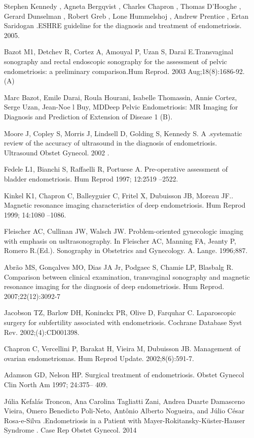 \documentclass[12pt]{article} %
\begin{document}
Stephen Kennedy , Agneta Bergqvist  , Charles Chapron  , Thomas D’Hooghe  , Gerard Dunselman  , Robert Greb  , Lone Hummelshoj  , Andrew Prentice  , Ertan Saridogan .ESHRE guideline for the diagnosis and treatment of endometriosis. 2005.

Bazot M1, Detchev R, Cortez A, Amouyal P, Uzan S, Daraï E.Transvaginal sonography and rectal endoscopic sonography for the assessment of pelvic endometriosis: a preliminary comparison.Hum Reprod. 2003 Aug;18(8):1686-92. (A)

Marc Bazot, Emile Darai, Roula Hourani, Isabelle Thomassin, Annie Cortez, Serge Uzan, 
Jean-Noe l Buy, MDDeep Pelvic Endometriosis: MR Imaging for Diagnosis and Prediction of Extension of Disease 1 (B).


Moore J, Copley S, Morris J, Lindsell D, Golding S, Kennedy S. A .systematic review of the accuracy of ultrasound in the diagnosis of endometriosis. Ultrasound Obstet Gynecol. 2002 .

Fedele L1, Bianchi S, Raffaelli R, Portuese A. Pre-operative assessment of bladder endometriosis. Hum Reprod 1997; 12:2519 –2522.

Kinkel K1, Chapron C, Balleyguier C, Fritel X, Dubuisson JB, Moreau JF.. Magnetic resonance imaging characteristics of deep endometriosis. Hum Reprod 1999; 14:1080 –1086.

Fleischer AC, Cullinan JW, Walsch JW. Problem-oriented gynecologic imaging with emphasis on usltrasonography. In Fleischer AC, Manning FA, Jeanty P, Romero R.(Ed.). Sonography in Obstetrics and Gynecology. A.
Lange. 1996;887.

Abrão MS, Gonçalves MO, Dias JA Jr, Podgaec S, Chamie LP, Blasbalg R. Comparison between clinical examination, transvaginal sonography and magnetic resonance imaging for the diagnosis of
deep endometriosis. Hum Reprod. 2007;22(12):3092-7


Jacobson TZ, Barlow DH, Koninckx PR, Olive D, Farquhar C. Laparoscopic surgery for subfertility associated with endometriosis. Cochrane Database Syst Rev. 2002;(4):CD001398.


Chapron C, Vercellini P, Barakat H, Vieira M, Dubuisson JB. Management of ovarian endometriomas. Hum Reprod Update. 2002;8(6):591-7.

Adamson GD, Nelson HP. Surgical treatment of endometriosis. Obstet Gynecol Clin North Am 1997; 24:375– 409.



Júlia Kefalás Troncon, Ana Carolina Tagliatti Zani, Andrea Duarte Damasceno Vieira, Omero Benedicto Poli-Neto, Antônio Alberto Nogueira, and Júlio César Rosa-e-Silva .Endometriosis in a Patient with Mayer-Rokitansky-Küster-Hauser Syndrome . Case Rep Obstet Gynecol. 2014
\end{document}
